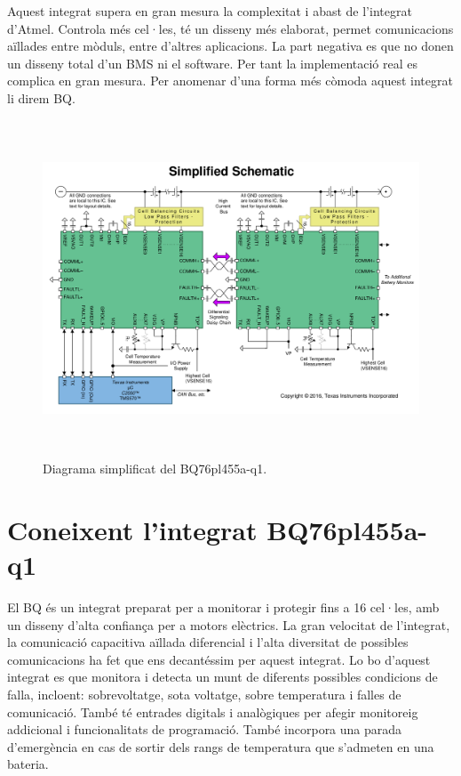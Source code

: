 Aquest integrat supera en gran mesura la complexitat i abast de l'integrat d'Atmel. Controla més cel·les, té un disseny més elaborat, permet comunicacions aïllades entre mòduls, entre d'altres aplicacions. La part negativa es que no donen un disseny total d'un BMS ni el software. Per tant la implementació real es complica en gran mesura. Per anomenar d'una forma més còmoda aquest integrat li direm BQ.

\begin{figure}[H]
	\centering
    \includegraphics[width=\textwidth, height=10cm] {Prototip/esquematicsimplificat.png}
    \caption{Diagrama simplificat del BQ76pl455a-q1.}
\end{figure}

\section{Coneixent l'integrat BQ76pl455a-q1 }

El BQ és un integrat preparat per a monitorar i protegir fins a 16 cel·les, amb un disseny d'alta confiança per a motors elèctrics. La gran velocitat de l'integrat, la comunicació capacitiva aïllada diferencial i l'alta diversitat de possibles comunicacions ha fet que ens decantéssim per aquest integrat. Lo bo d'aquest integrat es que monitora i detecta un munt de diferents possibles condicions de falla, incloent: sobrevoltatge, sota voltatge, sobre temperatura i falles de comunicació. També té entrades digitals i analògiques per afegir monitoreig addicional i funcionalitats de programació. També incorpora una parada d'emergència en cas de sortir dels rangs de temperatura que s'admeten en una bateria.

